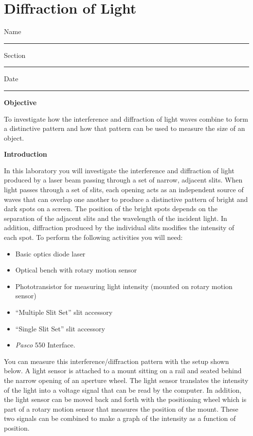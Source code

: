 
\section{Diffraction of Light}

Name \rule{2.0in}{0.1pt}\hfill{}Section \rule{1.0in}{0.1pt}\hfill{}Date
\rule{1.0in}{0.1pt}

\textbf{Objective}

To investigate how the interference and diffraction of light waves
combine to form a distinctive pattern and how that pattern can be
used to measure the size of an object.

\textbf{Introduction}

In this laboratory you will investigate the interference and diffraction
of light produced by a laser beam passing through a set of narrow,
adjacent slits. When light passes through a set of slits, each opening
acts as an independent source of waves that can overlap one another
to produce a distinctive pattern of bright and dark spots on a screen.
The position of the bright spots depends on the separation of the
adjacent slits and the wavelength of the incident light. In addition,
diffraction produced by the individual slits modifies the intensity
of each spot. To perform the following activities you will need:

\begin{itemize}
\item Basic optics diode laser
\item Optical bench with rotary motion sensor
\item Phototransistor for measuring light intensity (mounted on rotary motion sensor)
\item ``Multiple Slit Set'' slit accessory
\item ``Single Slit Set'' slit accessory
\item {\it Pasco} 550 Interface.
\end{itemize}
You can measure this interference/diffraction pattern with the setup
shown below. A light sensor is attached to a mount sitting on a rail and seated behind the 
narrow opening of an aperture wheel.
The light sensor translates the intensity 
of the light into a voltage signal that can be read by the
computer. In addition, the light sensor can be moved back and
forth with the positioning wheel which is part of a rotary motion sensor 
that measures the position of the mount. These two signals can be combined to
make a graph of the intensity as a function of position.


